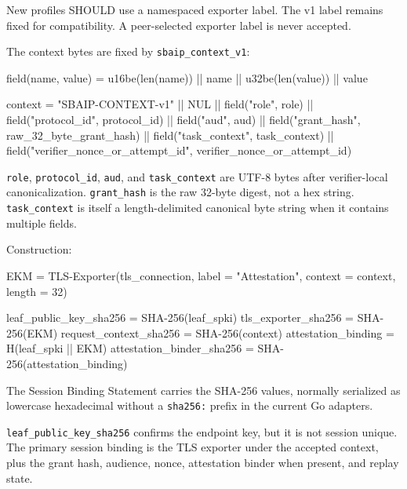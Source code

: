 \documentclass[
]{article}
\newenvironment{Shaded}{}{}
\newcommand{\NormalTok}[1]{#1}
\begin{document}
New profiles SHOULD use a namespaced exporter label. The v1 label
remains fixed for compatibility. A peer-selected exporter label is never
accepted.

The context bytes are fixed by \texttt{sbaip\_context\_v1}:

\begin{Shaded}
\begin{Highlighting}[]
\NormalTok{field(name, value) = u16be(len(name)) || name || u32be(len(value)) || value}

\NormalTok{context = "SBAIP{-}CONTEXT{-}v1" || NUL ||}
\NormalTok{          field("role", role) ||}
\NormalTok{          field("protocol\_id", protocol\_id) ||}
\NormalTok{          field("aud", aud) ||}
\NormalTok{          field("grant\_hash", raw\_32\_byte\_grant\_hash) ||}
\NormalTok{          field("task\_context", task\_context) ||}
\NormalTok{          field("verifier\_nonce\_or\_attempt\_id", verifier\_nonce\_or\_attempt\_id)}
\end{Highlighting}
\end{Shaded}

\texttt{role}, \texttt{protocol\_id}, \texttt{aud}, and
\texttt{task\_context} are UTF-8 bytes after verifier-local
canonicalization. \texttt{grant\_hash} is the raw 32-byte digest, not a
hex string. \texttt{task\_context} is itself a length-delimited
canonical byte string when it contains multiple fields.

Construction:

\begin{Shaded}
\begin{Highlighting}[]
\NormalTok{EKM = TLS{-}Exporter(tls\_connection,}
\NormalTok{                   label = "Attestation",}
\NormalTok{                   context = context,}
\NormalTok{                   length = 32)}

\NormalTok{leaf\_public\_key\_sha256     = SHA{-}256(leaf\_spki)}
\NormalTok{tls\_exporter\_sha256        = SHA{-}256(EKM)}
\NormalTok{request\_context\_sha256     = SHA{-}256(context)}
\NormalTok{attestation\_binding        = H(leaf\_spki || EKM)}
\NormalTok{attestation\_binder\_sha256  = SHA{-}256(attestation\_binding)}
\end{Highlighting}
\end{Shaded}

The Session Binding Statement carries the SHA-256 values, normally
serialized as lowercase hexadecimal without a \texttt{sha256:} prefix in
the current Go adapters.

\texttt{leaf\_public\_key\_sha256} confirms the endpoint key, but it is
not session unique. The primary session binding is the TLS exporter
under the accepted context, plus the grant hash, audience, nonce,
attestation binder when present, and replay state.
\end{document}
